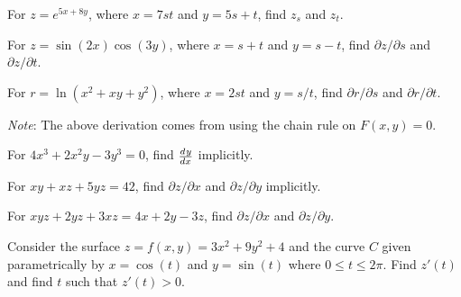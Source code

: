 \documentclass[mathNotesPreamble]{subfiles}
\begin{document}
  \begin{ex*}
    For $z=e^{5x+8y}$, where $x=7st$ and $y=5s+t$, find $z_s$ and $z_t$.
  \end{ex*}
  \pagebreak

  \begin{ex*}
    For $z=\sin(2x)\cos(3y)$, where $x=s+t$ and $y=s-t$, find $\partial z/\partial s$ and $\partial z/\partial t$.
  \end{ex*}

  \begin{ex*}
    For $r=\ln(x^2+xy+y^2)$, where $x=2st$ and $y=s/t$, find $\partial r/\partial s$ and $\partial r/\partial t$.
  \end{ex*}

  \pagebreak

  \noindent
  
  \textit{Note}: The above derivation comes from using the chain rule on $F(x,y)=0$.
  \vspace*{2\baselineskip}
  \begin{ex*}
    For $4x^3+2x^2y-3y^3=0$, find ${\frac{d^{}y}{dx^{}}}$ implicitly.
  \end{ex*}
  \begin{ex*}
    For $xy+xz+5yz=42$, find $\partial z/\partial x$ and $\partial z/\partial y$ implicitly.
  \end{ex*}
  \pagebreak

  \begin{ex*}
    For $xyz+2yz+3xz=4x+2y-3z$, find $\partial z/\partial x$ and $\partial z/\partial y$.
  \end{ex*}

  \begin{ex*}
    Consider the surface $z=f(x,y)=3x^2+9y^2+4$ and the curve $C$ given parametrically by $x=\cos(t)$ and $y=\sin(t)$ where $0\leq t\leq 2\pi$. Find $z'(t)$ and find $t$ such that $z'(t)>0$.
  \end{ex*}

  \pagebreak
  
\end{document}
